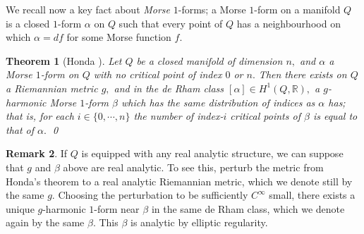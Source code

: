 \documentclass{article}
\theoremstyle{plain}%
\newtheorem{thm}{Theorem}[section]
\theoremstyle{definition}
\newtheorem{rem}[thm]{Remark}
\numberwithin{equation}{section}
\numberwithin{figure}{section}
\def\l{\label}
\def\R{{\mathbin{\mathbb R}}}
\def\al{\alpha}
\def\be{\beta}
\def\iy{\infty}
\begin{document}
We recall now a key fact about {\it Morse} $1$-forms; 
a Morse $1$-form on a manifold $Q$ is a closed $1$-form $\al$ on $Q$ such that every point of $Q$ has a neighbourhood on which $\al=df$ for some Morse function $f.$
\begin{thm}[{Honda \cite{Hn}}]\l{thm: Honda}
Let $Q$ be a closed manifold of dimension $n,$ and $\al$ a Morse $1$-form on $Q$ with no critical point of index $0$ or $n.$
Then there exists on $Q$ a Riemannian metric $g,$ and in the de Rham class $[\al]\in H^1(Q,\R),$ a $g$-harmonic Morse $1$-form $\be$ which has the same distribution of indices as $\al$ has;
that is, for each $i\in\{0,\cdots, n\}$ the number of index-$i$ critical points of $\be$ is equal to that of $\al.$
\qed
\end{thm}
\begin{rem}
If $Q$ is equipped with any real analytic structure, we can suppose that $g$ and $\be$ above are real analytic. To see this, perturb the metric from Honda's theorem to a real analytic Riemannian metric, which we denote still by the same $g$. Choosing the perturbation to be sufficiently $C^\iy$ small, there exists a unique $g$-harmonic $1$-form near $\be$ in the same de Rham class, which we denote again by the same $\be.$ This $\be$ is analytic by elliptic regularity.
\end{rem}
\end{document}
